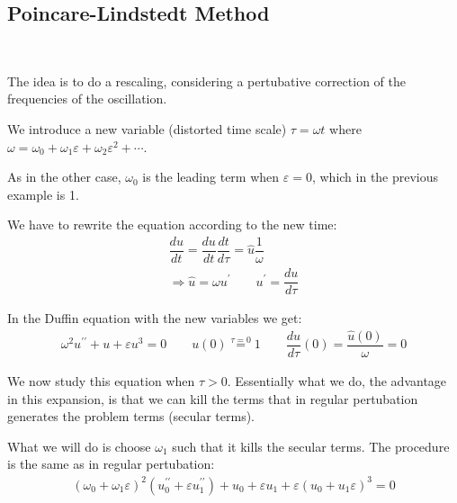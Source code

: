 \subsection{Poincare-Lindstedt Method}\hfill\\
\par\bigskip
\noindent The idea is to do a rescaling, considering a pertubative correction of the frequencies of the oscillation.
\par\bigskip
\noindent We introduce a new variable (distorted time scale) $\tau = \omega t$ where $\omega = \omega_0+\omega_1\varepsilon+\omega_2\varepsilon^2+\cdots$.\par
\noindent As in the other case, $\omega_0$ is the leading term when $\varepsilon=0$, which in the previous example is 1.
\par\bigskip
\noindent We have to rewrite the equation according to the new time:
\begin{equation*}
  \begin{gathered}
    \dfrac{du}{dt} = \dfrac{du}{dt}\dfrac{dt}{d\tau} = \hat{u}\dfrac{1}{\omega}\\
    \Rightarrow \hat{u} =\omega u^{\prime}\qquad u^{\prime} = \dfrac{du}{d\tau}
  \end{gathered}
\end{equation*}\par
\noindent In the Duffin equation with the new variables we get:
\begin{equation*}
  \begin{gathered}
    \omega^2u^{\prime\prime}+u+\varepsilon u^3=0 \qquad u(0) \stackrel{\tau=0}{=} 1\qquad \dfrac{du}{d\tau}(0)=\dfrac{\hat{u}(0)}{\omega} = 0
  \end{gathered}
\end{equation*}\par
\noindent We now study this equation when $\tau >0$. Essentially what we do, the advantage in this expansion, is that we can kill the terms that in regular pertubation generates the problem terms (secular terms).\par
\noindent What we will do is choose $\omega_1$ such that it kills the secular terms. The procedure is the same as in regular pertubation:
\begin{equation*}
  \begin{gathered}
    (\omega_0+\omega_1\varepsilon)^2(u^{\prime\prime}_0+\varepsilon u^{\prime\prime}_1)+u_0+\varepsilon u_1+\varepsilon(u_0+u_1\varepsilon)^3=0
  \end{gathered}
\end{equation*}\par
